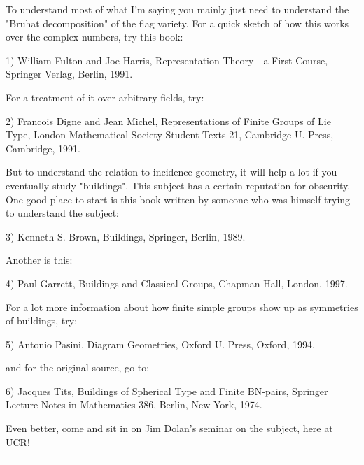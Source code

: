 To understand most of what I'm saying you mainly just need to understand
the "Bruhat decomposition" of the flag variety.  For a quick sketch of
how this works over the complex numbers, try this book:

1) William Fulton and Joe Harris, Representation Theory - a First
Course, Springer Verlag, Berlin, 1991.

For a treatment of it over arbitrary fields, try:

2) Francois Digne and Jean Michel, Representations of Finite Groups
of Lie Type, London Mathematical Society Student Texts 21, Cambridge
U. Press, Cambridge, 1991.

But to understand the relation to incidence geometry, it will
help a lot if you eventually study "buildings".  This subject has
a certain reputation for obscurity.  One good place to start is 
this book written by someone who was himself trying to understand
the subject:

3) Kenneth S. Brown, Buildings, Springer, Berlin, 1989.

Another is this:

4) Paul Garrett, Buildings and Classical Groups, Chapman \text{\&}  Hall,
London, 1997.

For a lot more information about how finite simple groups show up 
as symmetries of buildings, try:

5) Antonio Pasini, Diagram Geometries, Oxford U. Press, Oxford, 1994.

and for the original source, go to:

6) Jacques Tits, Buildings of Spherical Type and Finite BN-pairs,
Springer Lecture Notes in Mathematics 386, Berlin, New York, 1974.

Even better, come and sit in on Jim Dolan's seminar on the subject,
here at UCR!

\par\noindent\rule{\textwidth}{0.4pt}


